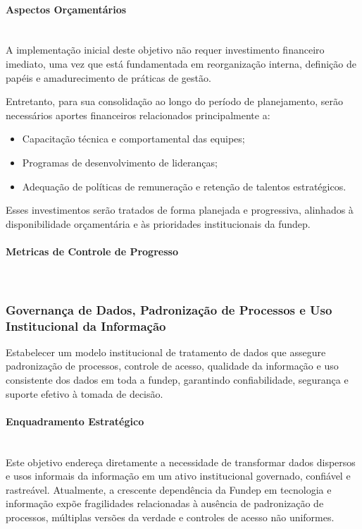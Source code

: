 \documentclass[12pt,a4paper]{article}
\begin{document}
\paragraph{Aspectos Orçamentários}\mbox{}\\

A implementação inicial deste objetivo não requer investimento financeiro imediato, uma vez que está fundamentada em reorganização interna, definição de papéis e amadurecimento de práticas de gestão.

Entretanto, para sua consolidação ao longo do período de planejamento, serão necessários aportes financeiros relacionados principalmente a:
\begin{itemize}
  \item Capacitação técnica e comportamental das equipes;
  \item Programas de desenvolvimento de lideranças;
  \item Adequação de políticas de remuneração e retenção de talentos estratégicos.
\end{itemize}

Esses investimentos serão tratados de forma planejada e progressiva, alinhados à disponibilidade orçamentária e às prioridades institucionais da \gls{fundep}.

\paragraph{Metricas de Controle de Progresso}\mbox{}\\


\subsubsection{Governança de Dados, Padronização de Processos e Uso Institucional da Informação}

Estabelecer um modelo institucional de tratamento de dados que assegure padronização de processos, controle de acesso, qualidade da informação e uso consistente dos dados em toda a \gls{fundep}, garantindo confiabilidade, segurança e suporte efetivo à tomada de decisão.

\paragraph{Enquadramento Estratégico}\mbox{}\\
Este objetivo endereça diretamente a necessidade de transformar dados dispersos e usos informais da informação em um ativo institucional governado, confiável e rastreável. Atualmente, a crescente dependência da Fundep em tecnologia e informação expõe fragilidades relacionadas à ausência de padronização de processos, múltiplas versões da verdade e controles de acesso não uniformes.
\end{document}
